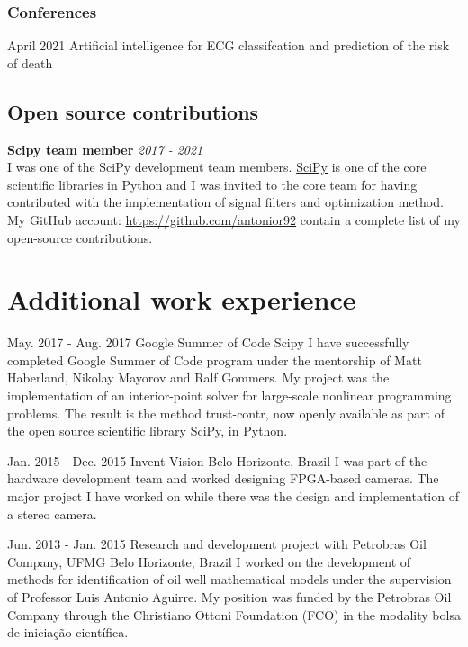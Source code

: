 \documentclass[10pt,letterpaper]{article} %
\begin{document}
\subsubsection*{Conferences}


    
    { April 2021 }
    { Artificial intelligence for ECG classifcation and prediction of the risk of death  }
    { }{}
    



\subsection*{Open source contributions}

{\bf Scipy team member} \hfill {\em 2017 - 2021} \\
I was one of the SciPy development team members.
\href{https://www.scipy.org}{SciPy} is one of the core scientific libraries in Python and I was invited to the core team
for having contributed with the implementation of signal filters
and optimization method.
My GitHub account: \href{https://github.com/antonior92}{https://github.com/antonior92}
contain a complete list of my open-source contributions.

\section*{Additional work experience} %


    { May. 2017 -   Aug. 2017 }
    { Google Summer of Code }
    { Scipy }
    { I have successfully completed Google Summer of Code program under the mentorship of Matt Haberland, Nikolay Mayorov and Ralf Gommers. My project was the implementation of an interior-point solver for large-scale nonlinear programming problems. The result is the method trust-contr, now openly available as part of the open source scientific library SciPy, in Python. }

    { Jan. 2015 -   Dec. 2015 }
    { Invent Vision }
    { Belo Horizonte, Brazil }
    { I was part of the hardware development team and worked designing FPGA-based cameras. The major project I have worked on while there was the design and implementation of a stereo camera. }

    { Jun. 2013 -   Jan. 2015 }
    { Research and development project with Petrobras Oil Company, UFMG }
    { Belo Horizonte, Brazil }
    { I worked on the development of methods for identification of oil well mathematical models under the supervision of Professor Luis Antonio Aguirre. My position was funded by the Petrobras Oil Company through the Christiano Ottoni Foundation (FCO) in the modality bolsa de iniciação científica. }
\end{document}
